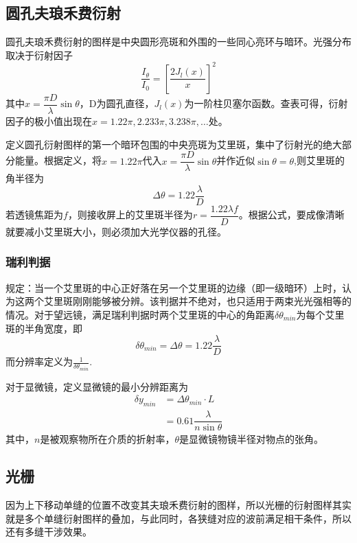 \subsection{圆孔夫琅禾费衍射}
圆孔夫琅禾费衍射的图样是中央圆形亮斑和外围的一些同心亮环与暗环。光强分布取决于衍射因子
\begin{equation}
    \dfrac{I_\theta}{I_0}=[\dfrac{2J_l(x)}{x}]^2
\end{equation}
其中$x=\dfrac{\pi D}{\lambda}\sin \theta$，D为圆孔直径，$J_l(x)$为一阶柱贝塞尔函数。查表可得，衍射因子的极小值出现在$x=1.22\pi,2.233\pi,3.238\pi,\dots$处。

定义圆孔衍射图样的第一个暗环包围的中央亮斑为艾里斑，集中了衍射光的绝大部分能量。根据定义，将$x=1.22\pi$代入$x=\dfrac{\pi D}{\lambda}\sin \theta$并作近似$\sin \theta= \theta$,则艾里斑的角半径为
\begin{equation}
    \Delta \theta = 1.22\dfrac{\lambda}{D}
\end{equation}
若透镜焦距为$f$，则接收屏上的艾里斑半径为$r=\dfrac{1.22\lambda f}{D}$。根据公式，要成像清晰就要减小艾里斑大小，则必须加大光学仪器的孔径。
\subsubsection{瑞利判据} 规定：当一个艾里斑的中心正好落在另一个艾里斑的边缘（即一级暗环）上时，认为这两个艾里斑刚刚能够被分辨。该判据并不绝对，也只适用于两束光光强相等的情况。对于望远镜，满足瑞利判据时两个艾里斑的中心的角距离$\delta \theta_{min}$为每个艾里斑的半角宽度，即
\begin{equation}
    \delta \theta_{min}=\Delta \theta = 1.22 \dfrac{\lambda }{D}
\end{equation}
而分辨率定义为$\frac{1}{\delta \theta_{min}}$.

对于显微镜，定义显微镜的最小分辨距离为
\begin{align}
    \delta y_{min}&=\Delta \theta_{min}\cdot L\\
    &=0.61\dfrac{\lambda}{n \sin \theta}
\end{align}
其中，$n$是被观察物所在介质的折射率，$\theta$是显微镜物镜半径对物点的张角。
\subsection{光栅}
因为上下移动单缝的位置不改变其夫琅禾费衍射的图样，所以光栅的衍射图样其实就是多个单缝衍射图样的叠加，与此同时，各狭缝对应的波前满足相干条件，所以还有多缝干涉效果。

